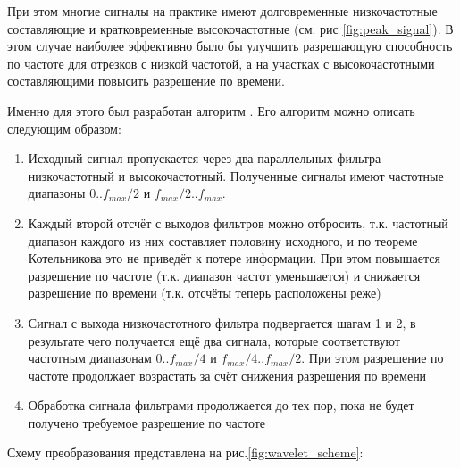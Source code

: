 При этом многие сигналы на практике имеют долговременные низкочастотные составляющие и кратковременные высокочастотные (см. рис \ref{fig:peak_signal}). В этом случае наиболее эффективно было бы улучшить разрешающую способность по частоте для отрезков с низкой частотой, а на участках с высокочастотными составляющими повысить разрешение по времени. 

Именно для этого был разработан алгоритм . Его алгоритм можно описать следующим образом:

\begin{enumerate}
\item Исходный сигнал пропускается через два параллельных фильтра - низкочастотный и высокочастотный. Полученные сигналы имеют частотные диапазоны $0..f_{max}/2$ и $f_{max}/2..f_{max}$.
\item Каждый второй отсчёт с выходов фильтров можно отбросить, т.к. частотный диапазон каждого из них составляет половину исходного, и по теореме Котельникова это не приведёт к потере информации. При этом повышается разрешение по частоте (т.к. диапазон частот уменьшается) и снижается разрешение по времени (т.к. отсчёты теперь расположены реже)

\item Сигнал с выхода низкочастотного фильтра подвергается шагам 1 и 2, в результате чего получается ещё два сигнала, которые соответствуют частотным диапазонам $0..f_{max}/4$ и $f_{max}/4..f_{max}/2$. При этом разрешение по частоте продолжает возрастать за счёт снижения разрешения по времени
\item Обработка сигнала фильтрами продолжается до тех пор, пока не будет получено требуемое разрешение по частоте
\end{enumerate}

Схему преобразования представлена на рис.\ref{fig:wavelet_scheme}:




